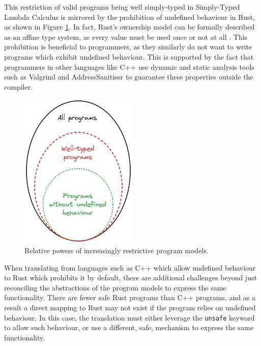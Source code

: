 This restriction of valid programs being well simply-typed in Simply-Typed Lambda Calculus is mirrored by the prohibition of undefined behaviour in Rust, as shown in Figure \ref{fig:excalidraw_programs_venn}. In fact, Rust's ownership model can be formally described as an affine type system, as every value must be used once or not at all \cite{reed2015patina}. This prohibition is beneficial to programmers, as they similarly do not want to write programs which exhibit undefined behaviour. This is supported by the fact that programmers in other languages like C++ use dynamic and static analysis tools such as Valgrind \cite{ValgrindHome} and AddressSanitiser \cite{Sanitizers2023} to guarantee these properties outside the compiler.

\begin{figure}[H]
    \centering
    \includegraphics[width=0.5\textwidth]{images/3_translation/excalidraw_programs_venn.png}
    \caption{Relative powers of increasingly restrictive program models.}
    \label{fig:excalidraw_programs_venn}
\end{figure}

When translating from languages such as C++ which allow undefined behaviour to Rust which prohibits it by default, there are additional challenges beyond just reconciling the abstractions of the program models to express the same functionality. There are fewer safe Rust programs than C++ programs, and as a result a direct mapping to Rust may not exist if the program relies on undefined behaviour. In this case, the translation must either leverage the \texttt{unsafe} keyword to allow such behaviour, or use a different, safe, mechanism to express the same functionality.


